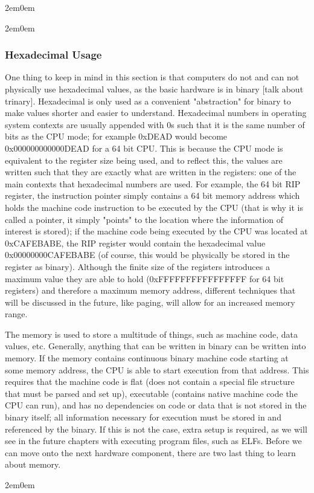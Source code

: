 \documentclass[openany, 12px]{book}
\begin{document}
\begin{adjustwidth}{2em}{0em}
\begin{adjustwidth}{2em}{0em}
\subsubsection{Hexadecimal Usage}
One thing to keep in mind in this section is that computers do not and can not physically use hexadecimal values, as the basic hardware is in binary [talk about trinary]. Hexadecimal is only used as a convenient "abstraction" for binary to make values shorter and easier to understand. Hexadecimal numbers in operating system contexts are usually appended with 0s such that it is the same number of bits as the CPU mode; for example 0xDEAD would become 0x000000000000DEAD for a 64 bit CPU. This is because the CPU mode is equivalent to the register size being used, and to reflect this, the values are written such that they are exactly what are written in the registers: one of the main contexts that hexadecimal numbers are used. For example, the 64 bit RIP register, the instruction pointer simply contains a 64 bit memory address which holds the machine code instruction to be executed by the CPU (that is why it is called a pointer, it simply "points" to the location where the information of interest is stored); if the machine code being executed by the CPU was located at 0xCAFEBABE, the RIP register would contain the hexadecimal value 0x00000000CAFEBABE (of course, this would be physically be stored in the register as binary). Although the finite size of the registers introduces a maximum value they are able to hold (0xFFFFFFFFFFFFFFFF for 64 bit registers) and therefore a maximum memory address, different techniques that will be discussed in the future, like paging, will allow for an increased memory range.
\end{adjustwidth}
The memory is used to store a multitude of things, such as machine code, data values, etc. Generally, anything that can be written in binary can be written into memory. If the memory contains continuous binary machine code starting at some memory address, the CPU is able to start execution from that address. This requires that the machine code is flat (does not contain a special file structure that must be parsed and set up), executable (contains native machine code the CPU can run), and has no dependencies on code or data that is not stored in the binary itself; all information necessary for execution must be stored in and referenced by the binary. If this is not the case, extra setup is required, as we will see in the future chapters with executing program files, such as ELFs. Before we can move onto the next hardware component, there are two last thing to learn about memory.
\begin{adjustwidth}{2em}{0em}

\end{adjustwidth}
\end{adjustwidth}
\end{document}
